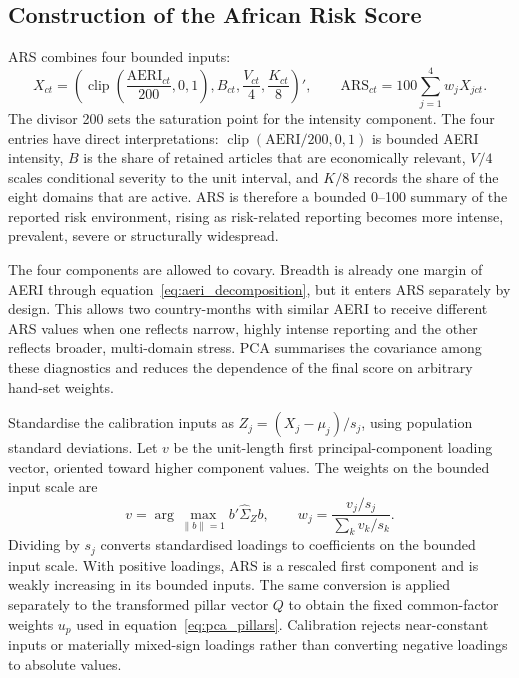 \documentclass[12pt]{article}
\newcommand{\clip}{\operatorname{clip}}
\begin{document}
\subsection{Construction of the African Risk Score}\label{sec:ars}
ARS combines four bounded inputs:
\begin{equation}X_{ct}=\left(\clip\left(\frac{\mathrm{AERI}_{ct}}{200},0,1\right),B_{ct},\frac{V_{ct}}4,\frac{K_{ct}}8\right)',\qquad\mathrm{ARS}_{ct}=100\sum_{j=1}^{4}w_jX_{jct}.\label{eq:ars}\end{equation}
The divisor 200 sets the saturation point for the intensity component. The four entries have direct interpretations: $\clip(\mathrm{AERI}/200,0,1)$ is bounded AERI intensity, $B$ is the share of retained articles that are economically relevant, $V/4$ scales conditional severity to the unit interval, and $K/8$ records the share of the eight domains that are active. ARS is therefore a bounded 0--100 summary of the reported risk environment, rising as risk-related reporting becomes more intense, prevalent, severe or structurally widespread.

The four components are allowed to covary. Breadth is already one margin of AERI through equation~\eqref{eq:aeri_decomposition}, but it enters ARS separately by design. This allows two country-months with similar AERI to receive different ARS values when one reflects narrow, highly intense reporting and the other reflects broader, multi-domain stress. PCA summarises the covariance among these diagnostics and reduces the dependence of the final score on arbitrary hand-set weights.

Standardise the calibration inputs as $Z_j=(X_j-\mu_j)/s_j$, using population standard deviations. Let $v$ be the unit-length first principal-component loading vector, oriented toward higher component values. The weights on the bounded input scale are
\begin{equation}v=\arg\max_{\|b\|=1}b'\widehat\Sigma_Zb,\qquad w_j=\frac{v_j/s_j}{\sum_kv_k/s_k}.\label{eq:weights}\end{equation}
Dividing by $s_j$ converts standardised loadings to coefficients on the bounded input scale. With positive loadings, ARS is a rescaled first component and is weakly increasing in its bounded inputs. The same conversion is applied separately to the transformed pillar vector $Q$ to obtain the fixed common-factor weights $u_p$ used in equation~\eqref{eq:pca_pillars}. Calibration rejects near-constant inputs or materially mixed-sign loadings rather than converting negative loadings to absolute values.
\end{document}
